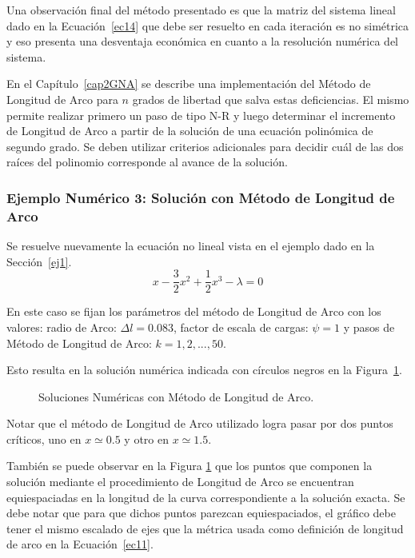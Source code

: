 Una observación final del método presentado es que la matriz del sistema lineal dado en la Ecuación~\eqref{ec14} que debe ser resuelto en cada iteración es no simétrica y eso presenta una desventaja económica en cuanto a la resolución numérica del sistema. 

En el Capítulo~\ref{cap2GNA} se describe una implementación del Método de Longitud de Arco para $n$ grados de libertad que salva estas deficiencias. El mismo permite realizar primero un paso de tipo N-R y luego determinar el incremento de Longitud de Arco a partir de la solución de una ecuación polinómica de segundo grado. Se deben utilizar criterios adicionales para decidir cuál de las dos raíces del polinomio corresponde al avance de la solución.

\subsubsection{Ejemplo Numérico 3: Solución con Método de Longitud de Arco}

Se resuelve nuevamente la ecuación no lineal vista en el ejemplo dado en la Sección~\ref{ej1}.
%
\begin{equation}
x-\frac{3}{2}x^2+\frac{1}{2}x^3-\lambda=0
\end{equation}

En este caso se fijan los parámetros del método de Longitud de Arco con los valores: radio de Arco: $\Delta l = 0.083$, factor de escala de cargas: $\psi = 1$ y pasos de Método de Longitud de Arco: $k=1,2,...,50$.

Esto resulta en la solución numérica indicada con círculos negros en la Figura~\ref{fig:fig6}.

\begin{figure}[htb]
	\centering
	\resizebox{\textwidth}{!}{}
	\caption{Soluciones Numéricas con Método de Longitud de Arco.}
	\label{fig:fig6}
\end{figure}

Notar que el método de Longitud de Arco utilizado logra pasar por dos puntos críticos, uno en $x\simeq 0.5$ y otro en $x\simeq 1.5$.

También se puede observar en la Figura \ref{fig:fig6} que los puntos que componen la solución mediante el procedimiento de Longitud de Arco se encuentran equiespaciadas en la longitud de la curva correspondiente a la solución exacta. Se debe notar que para que dichos puntos parezcan equiespaciados, el gráfico debe tener el mismo escalado de ejes que la métrica usada como definición de longitud de arco en la Ecuación~\eqref{ec11}.

